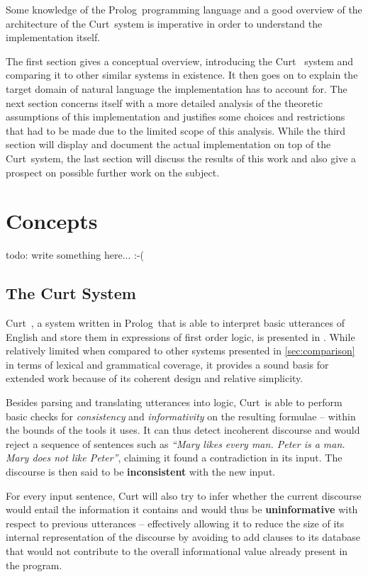 \documentclass[12pt,a4paper]{article}
\newcommand{\term}[1]{\textsf{\textbf{#1}}} %
\newcommand{\pn}{\textsf} %
\newcommand{\curt}{\pn{Curt}\mbox{ }}
\newcommand{\prol}{\pn{Prolog}\mbox{ }}
\theoremstyle{remark} \newtheorem*{termin}{Terminology} %
\begin{document}
Some knowledge of the \prol programming language and a good overview of the
architecture of the \curt system is imperative in order to understand the
implementation itself.

The first section gives a conceptual overview, introducing the \curt
system and comparing it to other similar systems in existence. It then goes on
to explain the target domain of natural language the implementation has to
account for.
The next section concerns itself with a more detailed analysis of the theoretic
assumptions of this implementation and justifies some choices and restrictions
that had to be made due to the limited scope of this analysis. While the
third section will display and document the actual implementation on top of the
\curt system, the last section will discuss the results of this work and also
give a prospect on possible further work on the subject.


\section{Concepts}

todo: write something here... :-(

\subsection{The Curt System} \label{sec:curt}

\curt, a system written in \prol that is able to interpret basic utterances
of English and store them in expressions of first order logic, is
presented in \cite[chapter 6]{blackburnbos:cl1}. While relatively limited when
compared to other systems presented in \ref{sec:comparison} in terms of lexical
and grammatical coverage, it provides a sound basis for extended work because of
its coherent design and relative simplicity.

Besides parsing and translating utterances into logic, \curt is able to perform
basic checks for \emph{consistency} and \emph{informativity} on the resulting
formulae -- within the bounds of the tools it uses.
It can thus detect incoherent discourse and would reject a sequence of
sentences such as \emph{``Mary likes every man. Peter is a man. Mary does not
like Peter''}, claiming it found a contradiction in its input. The discourse is
then said to be \term{inconsistent} with the new input.

For every input
sentence, \pn{Curt} will also try to infer whether the current discourse would
entail the information it contains and would thus be \term{uninformative} with
respect to previous utterances – effectively allowing it to
reduce the size of its internal representation of the discourse by avoiding to
add clauses to its database that would not contribute to the overall informational value
already present in the program.
\end{document}
